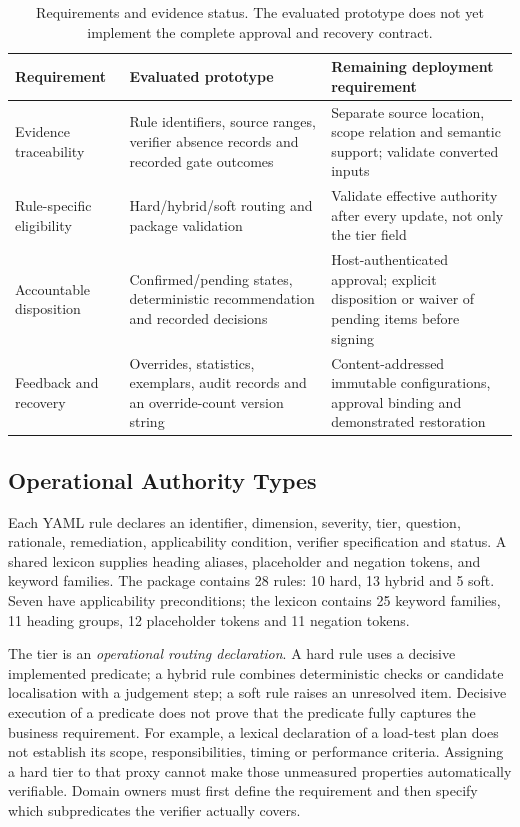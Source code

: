 \begin{table}[!ht]
\caption{Requirements and evidence status. The evaluated prototype does not yet implement the complete approval and recovery contract.}
\label{tab:reqs}
\centering\footnotesize
\begin{tabularx}{\textwidth}{@{}p{2.4cm}XX@{}}
\toprule
Requirement & Evaluated prototype & Remaining deployment requirement \\
\midrule
Evidence traceability & Rule identifiers, source ranges, verifier absence records and recorded gate outcomes & Separate source location, scope relation and semantic support; validate converted inputs \\
Rule-specific eligibility & Hard/hybrid/soft routing and package validation & Validate effective authority after every update, not only the tier field \\
Accountable disposition & Confirmed/pending states, deterministic recommendation and recorded decisions & Host-authenticated approval; explicit disposition or waiver of pending items before signing \\
Feedback and recovery & Overrides, statistics, exemplars, audit records and an override-count version string & Content-addressed immutable configurations, approval binding and demonstrated restoration \\
\bottomrule
\end{tabularx}
\end{table}

\subsection{Operational Authority Types}\label{sec:rules}

Each YAML rule declares an identifier, dimension, severity, tier, question, rationale, remediation, applicability condition, verifier specification and status. A shared lexicon supplies heading aliases, placeholder and negation tokens, and keyword families. The package contains 28 rules: 10 hard, 13 hybrid and 5 soft. Seven have applicability preconditions; the lexicon contains 25 keyword families, 11 heading groups, 12 placeholder tokens and 11 negation tokens.

The tier is an \emph{operational routing declaration}. A hard rule uses a decisive implemented predicate; a hybrid rule combines deterministic checks or candidate localisation with a judgement step; a soft rule raises an unresolved item. Decisive execution of a predicate does not prove that the predicate fully captures the business requirement. For example, a lexical declaration of a load-test plan does not establish its scope, responsibilities, timing or performance criteria. Assigning a hard tier to that proxy cannot make those unmeasured properties automatically verifiable. Domain owners must first define the requirement and then specify which subpredicates the verifier actually covers.


